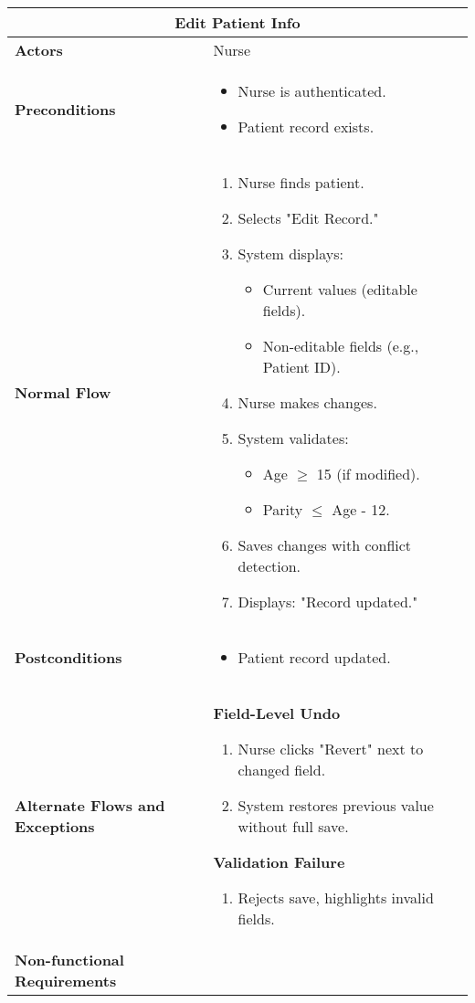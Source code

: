 \documentclass{article}
\begin{document}
\begin{longtable}{| p{5cm} | p{10cm} |}
    \hline
    \multicolumn{2}{|c|}{\textbf{Edit Patient Info}} \\
    \hline
    \textbf{Actors} & Nurse \\
    \hline
    \textbf{Preconditions} & 
    \begin{itemize}
        \item Nurse is authenticated.
        \item Patient record exists.
    \end{itemize} \\
    \hline
    \textbf{Normal Flow} & 
    \begin{enumerate}
        \item Nurse finds patient.
        \item Selects "Edit Record."
        \item System displays:
        \begin{itemize}
            \item Current values (editable fields).
            \item Non-editable fields (e.g., Patient ID).
        \end{itemize}
        \item Nurse makes changes.
        \item System validates:
        \begin{itemize}
            \item Age $\geq$ 15 (if modified).
            \item Parity $\leq$ Age - 12.
        \end{itemize}

        \item Saves changes with conflict detection.
        \item Displays: "Record updated."
    \end{enumerate} \\
    \hline
    \textbf{Postconditions} & 
    \begin{itemize}
        \item Patient record updated.
    \end{itemize} \\
    \hline
    \textbf{Alternate Flows and Exceptions} & 
    \textbf{Field-Level Undo}  
    \begin{enumerate}
        \item Nurse clicks "Revert" next to changed field.
        \item System restores previous value without full save.
    \end{enumerate}

    \textbf{Validation Failure}  
    \begin{enumerate}
        \item Rejects save, highlights invalid fields.
    \end{enumerate} \\
    \hline
    \textbf{Non-functional Requirements} &  \\
    \hline
\end{longtable}
\end{document}

